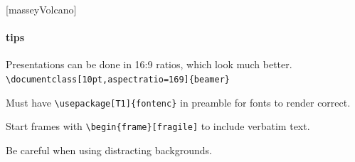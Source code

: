 \documentclass[10pt,aspectratio=169]{beamer}
\begin{document}
[masseyVolcano]

\begin{frame}[fragile] %
\framesubtitle{tips}
\setlength{\parskip}{\baselineskip}

Presentations can be done in  16:9 ratios, which look much better.\\
\verb|\documentclass[10pt,aspectratio=169]{beamer}|

Must have \verb|\usepackage[T1]{fontenc}| in preamble for fonts to render correct.

Start frames with \verb|\begin{frame}[fragile]| to include verbatim text.

Be careful when using distracting backgrounds. 

\end{frame}

\begin{frame}[plain]
\end{frame}
\end{document}
